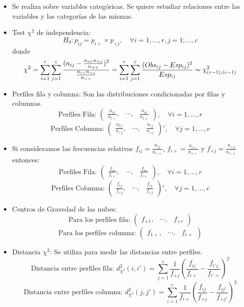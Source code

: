 \documentclass{article}
\begin{document}
\begin{itemize}
    \item Se realiza sobre variables categóricas. Se quiere estudiar relaciones entre las variables y las categorías de las mismas.
    \item Test $\chi^2$ de independencia: \[H_0:p_{ij}=p_{i+}\times p_{+j}, \quad \forall i=1,\dots,r,j=1;\dots,c\] donde \[\chi^2 = \sum_{i=1}^{r}\sum_{j=1}^{c}\frac{(n_{ij}-\frac{n_{i+}n_{+j}}{n_{++}})^2}{\frac{n_{i+}n_{+j}}{n_{++}}}=\sum_{i=1}^{r}\sum_{j=1}^{c}\frac{(Obs_{ij}-Esp_{ij})^2}{Esp_{ij}}\thicksim \chi^2_{(r-1),(c-1)}\]
    \item Perfiles fila y columna: Son las distribuciones condicionadas por filas y columnas. \[\text{Perfiles Fila: }\begin{pmatrix}\frac{n_{i1}}{n_{i+}}, & \cdots, & \frac{n_{ic}}{n_{i+}}\end{pmatrix}, \quad \forall i=1,\dots,r\] \[\text{Perfiles Columna: }\begin{pmatrix}\frac{n_{1j}}{n_{+j}}, & \cdots, & \frac{n_{rj}}{n_{+j}}\end{pmatrix}', \quad \forall j=1,\dots,c\]
    \item Si consideramos las frecuencias relativas $f_{ij}=\frac{n_{ij}}{n_{++}}$, $f_{i+}=\frac{n_{i+}}{n_{++}}$ y $f_{+j}=\frac{n_{+j}}{n_{++}}$ entonces: \[\text{Perfiles Fila: }\begin{pmatrix}\frac{f_{i1}}{f_{i+}}, & \cdots, & \frac{f_{ic}}{f_{i+}}\end{pmatrix}, \quad \forall i=1,\dots,r\] \[\text{Perfiles Columna: }\begin{pmatrix}\frac{f_{1j}}{f_{+j}}, & \cdots, & \frac{f_{rj}}{f_{+j}}\end{pmatrix}', \quad \forall j=1,\dots,c\]
    \item Centros de Gravedad de las nubes: \[\text{Para los perfiles fila: }\begin{pmatrix}f_{+1}, & \cdots, & f_{+r}\end{pmatrix}\] \[\text{Para los perfiles columna: }\begin{pmatrix}f_{1+}, & \cdots, & f_{c+}\end{pmatrix}\]
    \item Distancia $\chi^2$: Se utiliza para medir las distancias entre perfiles. \[\text{Distancia entre perfiles fila: }d^2_{\chi^2}(i,i')=\sum_{j=1}^{c}\frac{1}{f_{+j}}(\frac{f_{ij}}{f_{i+}}-\frac{f_{i'j}}{f_{i'+}})^2\] \[\text{Distancia entre perfiles columna: }d^2_{\chi^2}(j,j')=\sum_{i=1}^{c}\frac{1}{f_{i+}}(\frac{f_{ij}}{f_{+j}}-\frac{f_{ij'}}{f_{+j'}})^2\]

\end{itemize}
\end{document}
